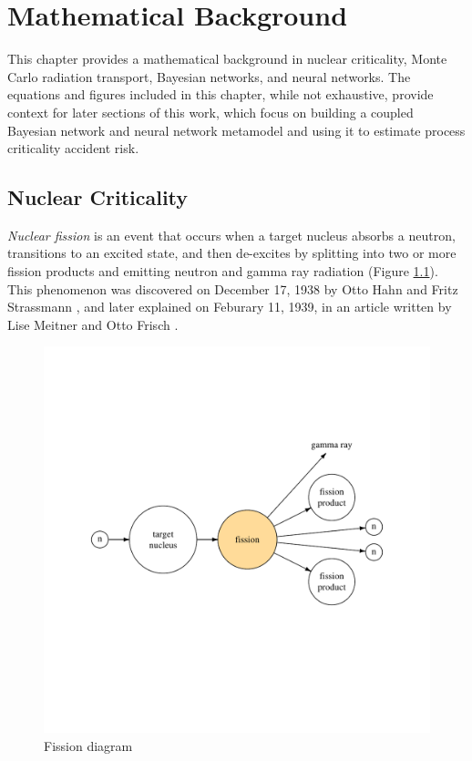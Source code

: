 

\chapter{Mathematical Background}

This chapter provides a mathematical background in nuclear criticality, Monte Carlo radiation transport, Bayesian networks, and neural networks.
The equations and figures included in this chapter, while not exhaustive, provide context for later sections of this work, which focus on building a coupled Bayesian network and neural network metamodel and using it to estimate process criticality accident risk.


\section{Nuclear Criticality}

\textit{Nuclear fission} is an event that occurs when a target nucleus absorbs a neutron, transitions to an excited state, and then de-excites by splitting into two or more fission products and emitting neutron and gamma ray radiation (Figure \ref{fig:fission}).
This phenomenon was discovered on December 17, 1938 by Otto Hahn and Fritz Strassmann \cite{hahn}, and later explained on Feburary 11, 1939, in an article written by Lise Meitner and Otto Frisch \cite{meitner}.

\begin{figure}
  \centering
  \includegraphics[trim={1.5cm 5.6cm 1.5cm 3.9cm}]{figures/fission.pdf}
  \caption{Fission diagram}
  \label{fig:fission}
\end{figure}


